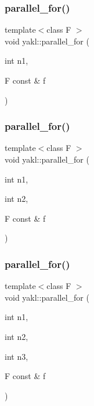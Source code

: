 \mbox{\label{namespaceyakl_a37fd33412c5c3aedf957694af5e6f56b}} 
\subsubsection{\texorpdfstring{parallel\+\_\+for()}{parallel\_for()}\hspace{0.1cm}{\footnotesize\ttfamily [1/16]}}
{\footnotesize\ttfamily template$<$class F $>$ \\
void yakl\+::parallel\+\_\+for (\begin{DoxyParamCaption}\item[{int}]{n1,  }\item[{F const \&}]{f }\end{DoxyParamCaption})\hspace{0.3cm}{\ttfamily [inline]}}

\mbox{\label{namespaceyakl_a9e476f666e8754ca35761e178cc0da8f}} 
\subsubsection{\texorpdfstring{parallel\+\_\+for()}{parallel\_for()}\hspace{0.1cm}{\footnotesize\ttfamily [2/16]}}
{\footnotesize\ttfamily template$<$class F $>$ \\
void yakl\+::parallel\+\_\+for (\begin{DoxyParamCaption}\item[{int}]{n1,  }\item[{int}]{n2,  }\item[{F const \&}]{f }\end{DoxyParamCaption})\hspace{0.3cm}{\ttfamily [inline]}}

\mbox{\label{namespaceyakl_ac86865a80e72eeb5bd8491d73e6e3bd6}} 
\subsubsection{\texorpdfstring{parallel\+\_\+for()}{parallel\_for()}\hspace{0.1cm}{\footnotesize\ttfamily [3/16]}}
{\footnotesize\ttfamily template$<$class F $>$ \\
void yakl\+::parallel\+\_\+for (\begin{DoxyParamCaption}\item[{int}]{n1,  }\item[{int}]{n2,  }\item[{int}]{n3,  }\item[{F const \&}]{f }\end{DoxyParamCaption})\hspace{0.3cm}{\ttfamily [inline]}}

